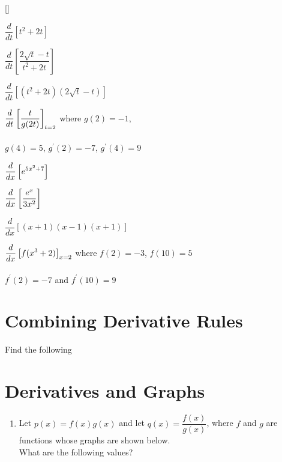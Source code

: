 \documentclass[10pt]{article}
\begin{document}
{{  \begin{enumerate}
  []{
    \item $\dfrac{d}{dt}[ t^2 + 2t]$
    \item $\dfrac{d}{dt}\left[\dfrac{2\sqrt{t}-t}{t^2+2t}\right]$
    \item $\dfrac{d}{dt}\left[(t^2+2t)(2\sqrt{t}-t)\right]$
      \item $\displaystyle \dfrac{d}{dt}\left[\frac{t}{g(2t)}\right]_{t=2}$  where $g(2)=-1$, \\\\$g(4)=5$, $g^{\prime}(2)= -7$, $g^{\prime}(4)= 9$ 
}{
    \item $\displaystyle \dfrac{d}{dx}\left[e^{5x^2+7}\right]$
    \item $\displaystyle \dfrac{d}{dx}\left[\frac{e^x}{3x^2}\right]$
    \item $\dfrac{d}{dx}\left[(x + 1)(x - 1)(x+1)\right]$
    \item $\displaystyle \frac{d}{dx} \left[ f(x^3+2) \right]_{x=2}$ where $f(2)=-3$, $f(10)=5$\\\\ $f^{\prime}(2)=-7$ and $f^{\prime}(10)=9$
    }
    \end{enumerate}
    \newpage
    
    \section{Combining Derivative Rules}
    Find the following
\newpage
\section{Derivatives and Graphs}
\begin{enumerate}
\item Let $p(x)=f(x)g(x)$ and let $q(x)=\dfrac{f(x)}{g(x)}$, where $f$ and $g$ are functions whose graphs are shown below.\\ What are the following values?\


\end{enumerate}}}
\end{document}
